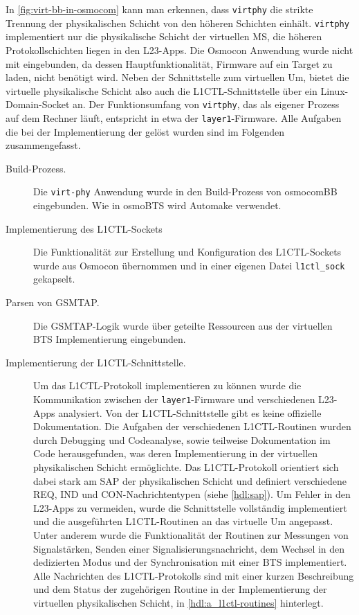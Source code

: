 In \autoref{fig:virt-bb-in-osmocom} kann man erkennen, dass \texttt{virtphy} die strikte Trennung der physikalischen Schicht von den höheren Schichten einhält. \texttt{virtphy} implementiert nur die physikalische Schicht der virtuellen \ac{MS}, die höheren Protokollschichten liegen in den L23-Apps. Die Osmocon Anwendung wurde nicht mit eingebunden, da dessen Hauptfunktionalität, Firmware auf ein Target zu laden, nicht benötigt wird. Neben der Schnittstelle zum virtuellen \ac{Um}, bietet die virtuelle physikalische Schicht also auch die \ac{L1CTL}-Schnittstelle über ein Linux-Domain-Socket an. Der Funktionsumfang von \texttt{virtphy}, das als eigener Prozess auf dem Rechner läuft, entspricht in etwa der \texttt{layer1}-Firmware. Alle Aufgaben die bei der Implementierung der gelöst wurden sind im Folgenden zusammengefasst.
\begin{description}
\item[Build-Prozess.] Die \texttt{virt-phy} Anwendung wurde in den Build-Prozess von osmocomBB eingebunden. Wie in osmoBTS wird Automake verwendet.
\item[Implementierung des \ac{L1CTL}-Sockets] Die Funktionalität zur Erstellung und Konfiguration des \ac{L1CTL}-Sockets wurde aus Osmocon übernommen und in einer eigenen Datei \texttt{l1ctl\_sock} gekapselt.
\item[Parsen von \ac{GSMTAP}.] Die \ac{GSMTAP}-Logik wurde über geteilte Ressourcen aus der virtuellen \ac{BTS} Implementierung eingebunden. 
\item[Implementierung der \ac{L1CTL}-Schnittstelle.] Um das \ac{L1CTL}-Protokoll implementieren zu können wurde die Kommunikation zwischen der \texttt{layer1}-Firmware und verschiedenen L23-Apps analysiert. Von der L1CTL-Schnittstelle gibt es keine offizielle Dokumentation. Die Aufgaben der verschiedenen \ac{L1CTL}-Routinen wurden durch Debugging und Codeanalyse, sowie teilweise Dokumentation im Code herausgefunden, was deren Implementierung in der virtuellen physikalischen Schicht ermöglichte. Das \ac{L1CTL}-Protokoll orientiert sich dabei stark am \ac{SAP} der physikalischen Schicht und definiert verschiedene \ac{REQ}, \ac{IND} und \ac{CON}-Nachrichtentypen (siehe \autoref{hdl:sap}). Um Fehler in den L23-Apps zu vermeiden, wurde die Schnittstelle vollständig implementiert und die ausgeführten \ac{L1CTL}-Routinen an das virtuelle \ac{Um} angepasst. Unter anderem wurde die Funktionalität der Routinen zur Messungen von Signalstärken, Senden einer Signalisierungsnachricht, dem Wechsel in den dedizierten Modus und der Synchronisation mit einer \ac{BTS} implementiert. Alle Nachrichten des \ac{L1CTL}-Protokolls sind mit einer kurzen Beschreibung und dem Status der zugehörigen Routine in der Implementierung der virtuellen physikalischen Schicht, in \autoref{hdl:a_l1ctl-routines} hinterlegt.

\end{description}
